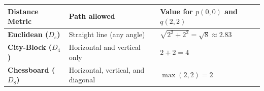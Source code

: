 \documentclass[12pt,a4paper]{article}
\renewcommand{\arraystretch}{1.45}
\begin{document}
\begin{tcolorbox}[tikzbox, title={Comparison of Pixel Distances}]
\centering
{\renewcommand{\arraystretch}{1.9}%
\begin{tabularx}{\linewidth}{|>{\bfseries}B{3.5cm}|Y|Y|}
\hline
Distance Metric & Path allowed & Value for $p(0,0)$ and $q(2,2)$ \\
\hline
Euclidean ($D_e$) & Straight line (any angle) & $\sqrt{2^2 + 2^2} = \sqrt{8} \approx 2.83$ \\[4pt]
\hline
City-Block ($D_4$) & Horizontal and vertical only & $2 + 2 = 4$ \\[4pt]
\hline
Chessboard ($D_8$) & Horizontal, vertical, and diagonal & $\max(2,2) = 2$ \\[4pt]
\hline
\end{tabularx}}
\end{tcolorbox}
\end{document}
